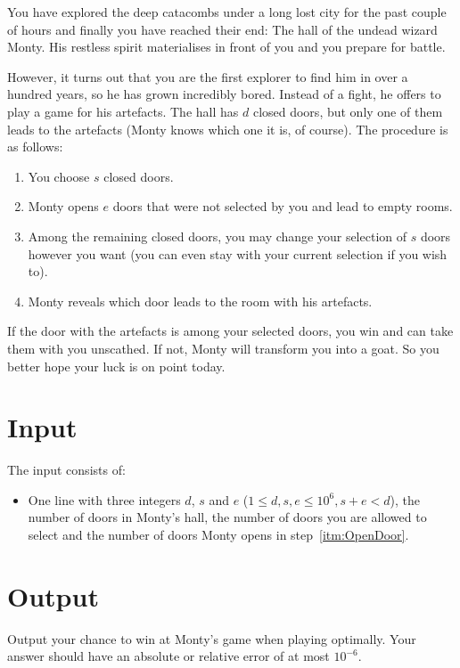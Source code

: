 
You have explored the deep catacombs under a long lost city for the past couple of hours and finally you have reached their end:
The hall of the undead wizard Monty. His restless spirit materialises in front of you and you prepare for battle.

However,
it turns out that you are the first explorer to find him in over a hundred years, so he has grown incredibly bored. Instead of a fight,
he offers to play a game for his artefacts. The hall has $d$ closed doors, but only one of them leads to the artefacts
(Monty knows which one it is, of course). The procedure is as follows:
\begin{enumerate}
	\item You choose $s$ closed doors.
	\item Monty opens $e$ doors that were not selected by you and lead to empty rooms.\label{itm:OpenDoor}
	\item Among the remaining closed doors, you may change your selection of $s$ doors however you want 
				(you can even stay with your current selection if you wish to). 
	\item Monty reveals which door leads to the room with his artefacts.
\end{enumerate}
If the door with the artefacts is among your selected doors, you win and can take them with you unscathed.
If not, Monty will transform you into a goat. So you better hope your luck is on point today.


\section*{Input}
The input consists of:
\begin{itemize}
	\item One line with three integers $d$, $s$ and $e$ ($1 \le d,s,e \le 10^{6}, s + e < d$), the number of doors in Monty's hall, the
	number of doors you are allowed to select and the number of doors Monty opens in step~\ref{itm:OpenDoor}.
\end{itemize}

\section*{Output}
Output your chance to win at Monty's game when playing optimally. Your answer should have an absolute or relative error of at most $10^{-6}$.
